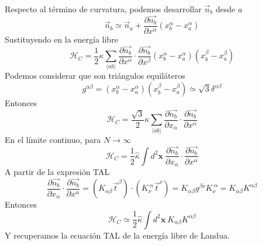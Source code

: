 Respecto al término de curvatura, podemos desarrollar $\vec{n}_{b}$ desde $a$
\begin{equation}
\vec{n}_b\simeq\vec{n}_a+\frac{\partial \vec{n_b}}{\partial x^{\alpha}}(x_b^{\alpha}-x_a^{\alpha})
\end{equation}
Sustituyendo en la energía libre
\begin{equation}
\mathcal{H}_C=\frac{1}{2}\kappa\sum_{\langle ab\rangle}\frac{\partial
  \vec{n_b}}{\partial x^{\alpha}}\cdot\frac{\partial \vec{n_b}}{\partial x^{\beta}} (x_b^{\alpha}-x_a^{\alpha})(x_b^{\beta}-x_a^{\beta})
\end{equation}
Podemos considerar que son triángulos equiláteros
\begin{equation}
g^{\alpha\beta}=(x_b^{\alpha}-x_a^{\alpha})(x_b^{\beta}-x_a^{\beta})\simeq
\sqrt{3} \delta^{\alpha\beta}
\end{equation}
Entonces
\begin{equation}
\mathcal{H}_C=\frac{\sqrt{3}}{2}\kappa\sum_{\langle ab\rangle}\frac{\partial
  \vec{n_b}}{\partial x_{\alpha}}\cdot\frac{\partial \vec{n_b}}{\partial x^{\alpha}}
\end{equation}
En el límite continuo, para $N\rightarrow \infty$
\begin{equation}
\mathcal{H}_C=\frac{1}{2}\hat{\kappa}\int d^2\mathbf{x}\ \frac{\partial
  \vec{n_b}}{\partial x_{\alpha}}\cdot\frac{\partial \vec{n_b}}{\partial x^{\alpha}}
\end{equation}
A partir de la expresión TAL
\begin{equation}
\frac{\partial \vec{n_b}}{\partial x_{\alpha}}\cdot\frac{\partial
  \vec{n_b}}{\partial x^{\alpha}}=(K_{\alpha\beta}\vec{t}^{\beta})\cdot(K_{\nu}^{\
  \alpha}\vec{t}^{\nu})=K_{\alpha\beta}g^{\beta\nu}K_{\nu}^{\ \alpha}=K_{\alpha\beta}K^{\alpha\beta}
\end{equation}
Entonces 
\begin{equation}
\mathcal{H}_C\simeq\frac{1}{2}\hat{\kappa}\int d^2\mathbf{x}\ K_{\alpha\beta}K^{\alpha\beta}
\end{equation}
Y recuperamos la ecuación TAL de la energía libre de Landua.

